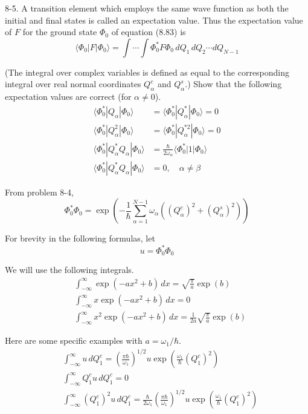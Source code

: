 \documentclass[12pt]{article}
\begin{document}
8-5.
A transition element which employs the same wave
function as both the initial and final states is called an expectation value.
Thus the expectation value of $F$ for the ground state $\Phi_0$ of
equation (8.83) is
\begin{equation*}
\langle\Phi_0|F|\Phi_0\rangle
=\int\cdots\int
\Phi_0^*F\Phi_0\,dQ_1\,dQ_2\cdots dQ_{N-1}
\tag{8.84}
\end{equation*}

(The integral over complex variables is defined as equal to the
corresponding integral over real normal coordinates $Q_\alpha^c$
and $Q_\alpha^s$.)
Show that the following expectation values are correct (for $\alpha\ne0$).
\begin{equation*}
\begin{aligned}
\langle\Phi_0^*|Q_\alpha|\Phi_0\rangle
&=\langle\Phi_0^*|Q_\alpha^*|\Phi_0\rangle=0
\\
\langle\Phi_0^*|Q_\alpha^2|\Phi_0\rangle
&=\langle\Phi_0^*|Q_\alpha^{*2}|\Phi_0\rangle=0
\\
\langle\Phi_0^*|Q_\alpha^*Q_\alpha|\Phi_0\rangle
&=\frac{\hbar}{2\omega_\alpha}\langle\Phi_0^*|1|\Phi_0\rangle
\\
\langle\Phi_0^*|Q_\alpha^*Q_\alpha|\Phi_0\rangle&=0,\quad\alpha\ne\beta
\end{aligned}
\tag{8.85}
\end{equation*}

From problem 8-4,
\begin{equation*}
\Phi_0^*\Phi_0
=\exp\left(
-\frac{1}{\hbar}
\sum_{\alpha=1}^{N-1}
\omega_\alpha\left((Q_\alpha^c)^2+(Q_\alpha^s)^2\right)
\right)
\end{equation*}

For brevity in the following formulas, let
\begin{equation*}
u=\Phi_0^*\Phi_0
\end{equation*}

We will use the following integrals.
\begin{align*}
&\int_{-\infty}^\infty\exp(-ax^2+b)\,dx=\sqrt{\frac{\pi}{a}}\exp(b)
\tag{1}
\\
&\int_{-\infty}^\infty x\exp(-ax^2+b)\,dx=0
\tag{2}
\\
&\int_{-\infty}^\infty x^2\exp(-ax^2+b)\,dx=\frac{1}{2a}\sqrt{\frac{\pi}{a}}\exp(b)
\tag{3}
\end{align*}

Here are some specific examples with $a=\omega_1/\hbar$.
\begin{align*}
&\int_{-\infty}^\infty u\,dQ_1^c=\left(\frac{\pi\hbar}{\omega_1}\right)^{1/2}
u\exp\left(\frac{\omega_1}{\hbar}(Q_1^c)^2\right)
\tag{4}
\\
&\int_{-\infty}^\infty Q_1^cu\,dQ_1^c=0
\tag{5}
\\
&\int_{-\infty}^\infty (Q_1^c)^2u\,dQ_1^c=\frac{\hbar}{2\omega_1}
\left(\frac{\pi\hbar}{\omega_1}\right)^{1/2}
u\exp\left(\frac{\omega_1}{\hbar}(Q_1^c)^2\right)
\tag{6}
\end{align*}
\end{document}
